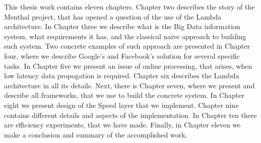 This thesis work contains eleven chapters.
Chapter two describes the story of the Menthal project, that has opened a question of the use of the Lambda architecture.
In Chapter three we describe what is the Big Data information system, what requirements it has, and the classical naive approach to building such system. 
Two concrete examples of such approach are presented in Chapter four, where we describe Google's and Facebook's solution for several specific tasks.
In Chapter five we present an issue of online processing, that arises, when low latency data propogation is required.
Chapter six describes the Lambda architecture in all its details.
Next, there is Chapter seven, where we present and describe all frameworks, that we use to build the concrete system.
In Chapter eight we present design of the Speed layer that we implement.
Chapter nine contains different details and aspects of the implementation.
In Chapter ten there are efficiency experiments, that we have made.
Finally, in Chapter eleven we make a conclusion and summary of the accomplished work.